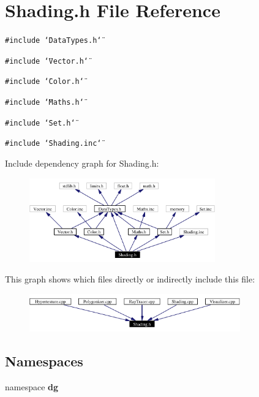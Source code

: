 \section{Shading.h File Reference}
\label{Shading_8h}
{\tt \#include \char`\"{}Data\-Types.h\char`\"{}}\par
{\tt \#include \char`\"{}Vector.h\char`\"{}}\par
{\tt \#include \char`\"{}Color.h\char`\"{}}\par
{\tt \#include \char`\"{}Maths.h\char`\"{}}\par
{\tt \#include \char`\"{}Set.h\char`\"{}}\par
{\tt \#include \char`\"{}Shading.inc\char`\"{}}\par


Include dependency graph for Shading.h:\begin{figure}[H]
\begin{center}
\leavevmode
\includegraphics[width=227pt]{Shading_8h__incl}
\end{center}
\end{figure}


This graph shows which files directly or indirectly include this file:\begin{figure}[H]
\begin{center}
\leavevmode
\includegraphics[width=258pt]{Shading_8h__dep__incl}
\end{center}
\end{figure}
\subsection*{Namespaces}
\begin{CompactItemize}
\item 
namespace {\bf dg}
\end{CompactItemize}
